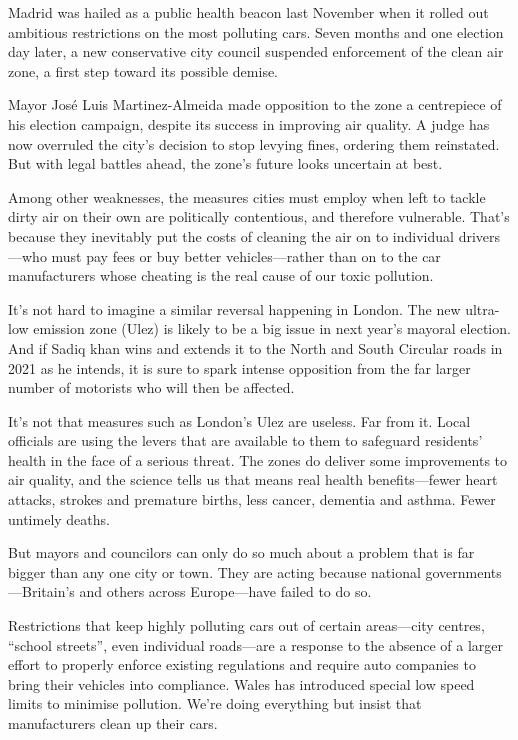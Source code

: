 Madrid was hailed as a public health beacon last November when it rolled out ambitious restrictions on the most polluting cars. Seven months and one election day later, a new conservative city council suspended enforcement of the clean air zone, a first step toward its possible demise.


Mayor José Luis Martinez-Almeida made opposition to the zone a centrepiece of his election campaign, despite its success in improving air quality. A judge has now overruled the city's decision to stop levying fines, ordering them reinstated. But with legal battles ahead, the zone's future looks uncertain at best.


Among other weaknesses, the measures cities must employ when left to tackle dirty air on their own are politically contentious, and therefore vulnerable. That's because they inevitably put the costs of cleaning the air on to individual drivers—who must pay fees or buy better vehicles—rather than on to the car manufacturers whose cheating is the real cause of our toxic pollution.


It's not hard to imagine a similar reversal happening in London. The new ultra-low emission zone (Ulez) is likely to be a big issue in next year's mayoral election. And if Sadiq khan wins and extends it to the North and South Circular roads in 2021 as he intends, it is sure to spark intense opposition from the far larger number of motorists who will then be affected.


It's not that measures such as London's Ulez are useless. Far from it. Local officials are using the levers that are available to them to safeguard residents' health in the face of a serious threat. The zones do deliver some improvements to air quality, and the science tells us that means real health benefits—fewer heart attacks, strokes and premature births, less cancer, dementia and asthma. Fewer untimely deaths.


But mayors and councilors can only do so much about a problem that is far bigger than any one city or town. They are acting because national governments—Britain's and others across Europe—have failed to do so.


Restrictions that keep highly polluting cars out of certain areas—city centres, ``school streets'', even individual roads—are a response to the absence of a larger effort to properly enforce existing regulations and require auto companies to bring their vehicles into compliance. Wales has introduced  special low speed limits to minimise pollution. We're doing everything but insist that manufacturers clean up their cars.


